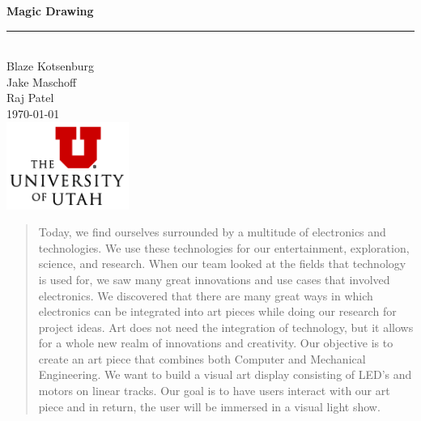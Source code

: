 \documentclass[12pt]{article}
\begin{document}
\begin{titlepage}

  \newcommand{\HRule}{\rule{\linewidth}{0.5mm}} %
  
  \vspace*{\fill}
  \center %
  
  { \huge \bfseries Magic Drawing}\\
  \HRule \\[1cm]

  \large Blaze Kotsenburg\\
  \large Jake Maschoff\\
  \large Raj Patel\\[1cm]
  
  \normalsize \today\\[4cm]
  
  \includegraphics[width=0.30\textwidth]{logo.png}
  \vspace*{\fill}
  
\end{titlepage}

\newpage
\tableofcontents
\noindent\hrulefill
\newpage

\begin{abstract}
  
  Today, we find ourselves surrounded by a multitude of electronics and technologies. We use these technologies for our entertainment, exploration, science, and research. When our team looked at the fields that technology is used for, we saw many great innovations and use cases that involved electronics. We discovered that there are many great ways in which electronics can be integrated into art pieces while doing our research for project ideas. Art does not need the integration of technology, but it allows for a whole new realm of innovations and creativity. Our objective is to create an art piece that combines both Computer and Mechanical Engineering. We want to build a visual art display consisting of LED’s and motors on linear tracks. Our goal is to have users interact with our art piece and in return, the user will be immersed in a visual light show.
\end{abstract}
\end{document}
